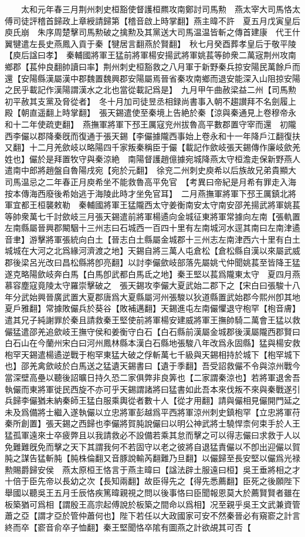 　　太和元年春三月荆州刺史桓豁使督護桓羆攻南鄭討司馬勲　燕太宰大司馬恪太傅司徒評稽首歸政上章綬請歸第【稽音啟上時掌翻】燕主暐不許　夏五月戊寅皇后庾氏崩　朱序周楚擊司馬勲破之擒勲及其黨送大司馬温温皆斬之傳首建康　代王什翼犍遣左長史燕鳳入貢于秦【犍居言翻燕於賢翻】　秋七月癸酉葬孝皇后于敬平陵【庾后諡曰孝】　秦輔國將軍王猛前將軍楊安揚武將軍姚萇等帥衆二萬宼荆州攻南鄉郡【萇仲良翻帥讀曰率】荆州刺史桓豁救之八月軍于新野秦兵掠安陽民萬餘戶而還【安陽縣漢屬漢中郡魏置魏興郡安陽屬焉晉省秦攻南鄉而退安能深入山阻掠安陽之民乎載記作漢陽謂漢水之北也當從載記爲是】　九月甲午曲赦梁益二州【司馬勲初平赦其支黨及脅從者】　冬十月加司徒昱丞相録尚書事入朝不趨讃拜不名劍履上殿【朝直遥翻上時掌翻】　張天錫遣使至秦境上告絶於秦【涼與秦通見上卷穆帝永和十二年使疏吏翻】　燕撫軍將軍下邳王厲寇兖州拔魯高平數郡置守宰而還　初隴西李儼以郡降秦旣而復通于張天錫【李儼據隴西事始上卷永和十一年降戶江翻復扶又翻】十二月羌歛岐以略陽四千家叛秦稱臣于儼【載記作歛岐張天錫傳作廉岐歛羌姓也】儼於是拜置牧守與秦涼絶　南陽督護趙億據宛城降燕太守桓澹走保新野燕人遣南中郎將趙盤自魯陽戌宛【宛於元翻】　徐兖二州刺史庾希以后族故兄弟貴顯大司馬温忌之二年春正月庾希坐不能救魯高平免官　【考異曰帝紀是月希有罪走入海按本傳海西廢後希始逃于海陵此時才坐免官耳】　二月燕撫軍將軍下邳王厲鎮北將軍宜都王桓襲敕勒　秦輔國將軍王猛隴西太守姜衡南安太守南安邵羌揚武將軍姚萇等帥衆萬七千討歛岐三月張天錫遣前將軍楊遹向金城征東將軍常據向左南【張軌置左南縣屬晉興郡闞駰十三州志曰石城西一百四十里有左南城河水逕其南曰左南津遹音聿】游擊將軍張統向白土【晉志白土縣屬金城郡十三州志左南津西六十里有白土城城在大河之北爲緣河濟渡之地】天錫自將三萬人屯倉松【倉松縣自漢以來屬武威郡後梁呂光改曰昌松縣將卽亮翻】以討李儼歛岐部落先屬姚弋仲聞姚萇至皆降王猛遂克略陽歛岐奔白馬【白馬卽武都白馬氐之地】秦王堅以萇爲隴東太守　夏四月燕慕容塵寇竟陵太守羅崇擊破之　張天錫攻李儼大夏武始二郡下之【宋白曰張駿十八年分武始興晉廣武置大夏郡唐爲大夏縣屬河州張駿以狄道縣置武始郡今熙州卽其地夏戶雅翻】常據敗儼兵於葵谷【敗補邁翻】天錫進屯左南儼懼退守枹罕【枹音膚】遣其兄子純謝罪於秦且請救秦王堅使前將軍楊安建威將軍王撫帥騎二萬會王猛以救儼猛遣邵羌追歛岐王撫守侯和姜衡守白石【白石縣前漢屬金城郡後漢屬隴西郡賢曰白石山在今蘭州宋白曰河州鳳林縣本漢白石縣地張駿八年改爲永固縣】猛與楊安救枹罕天錫遣楊遹逆戰于枹罕東猛大破之俘斬萬七千級與天錫相持於城下【枹罕城下也】邵羌禽歛岐於白馬送之猛遺天錫書曰【遺于季翻】吾受詔救儼不令與涼州戰今當深壁高壘以聽後詔曠日持久恐二家俱弊非良筭也【二家謂秦涼也】若將軍退舍吾執儼而東將軍徙民西旋不亦可乎天錫謂諸將曰猛書如此吾本來伐叛不來與秦戰遂引兵歸李儼猶未納秦師王猛白服乘輿從者數十人【從才用翻】請與儼相見儼開門延之未及爲備將士繼入遂執儼以立忠將軍彭越爲平西將軍涼州刺史鎮枹罕【立忠將軍苻秦所創置】張天錫之西歸也李儼將賀肫說儼曰以明公神武將士驍悍柰何束手於人王猛孤軍遠來士卒疲弊且以我請救必不設備若乘其怠而擊之可以得志儼曰求救于人以免難難旣免而擊之天下其謂我何不若固守以老之彼將自退猛責儼以不卽出迎儼以賀肫之謀告猛斬肫【肫株倫翻又音豚說輸芮翻難乃旦翻】以儼歸至長安堅以儼爲光禄勲賜爵歸安侯　燕太原桓王恪言于燕主暐曰【諡法辟土服遠曰桓】吳王垂將相之才十倍于臣先帝以長幼之次【長知兩翻】故臣得先之【得先悉薦翻】臣死之後願陛下舉國以聽吳王五月壬辰恪疾篤暐親視之問以後事恪曰臣聞報恩莫大於薦賢賢者雖在板築猶可爲相【謂殷王高宗起傅說於板築之間命以爲相】况至親乎吳王文武兼資管蕭之亞【謂才亞於管仲蕭何也】陛下若任以大政國家可安不然秦晉必有窺窬之計言終而卒【窬音俞卒子恤翻】秦王堅聞恪卒隂有圖燕之計欲覘其可否【